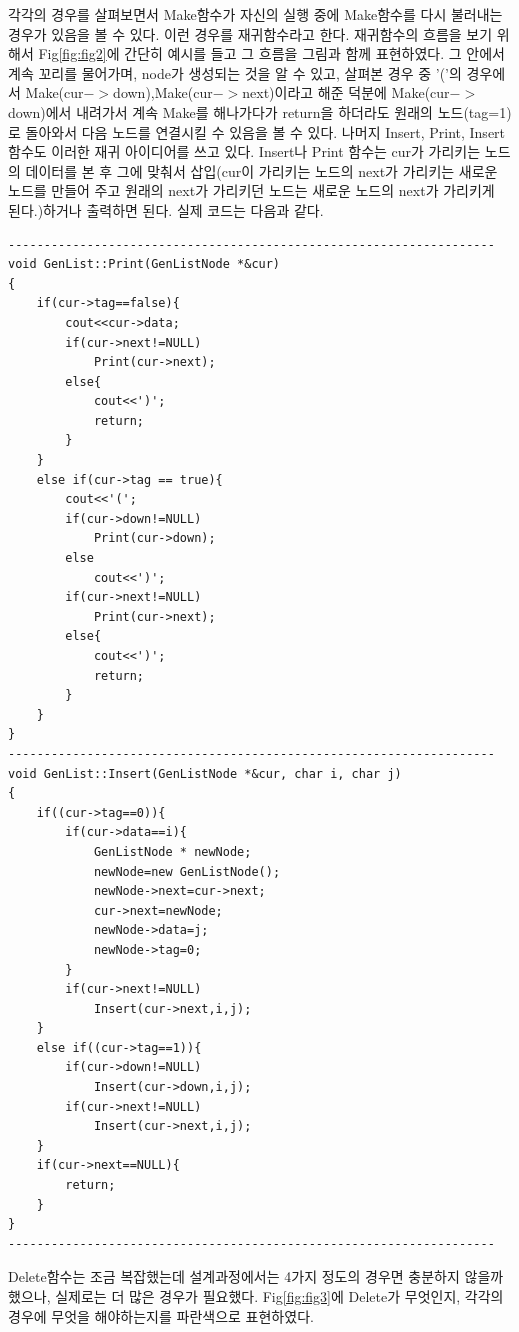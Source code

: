 \documentclass[a4paper,11pt]{article}
\begin{document}
각각의 경우를 살펴보면서 Make함수가 자신의 실행 중에 Make함수를 다시 불러내는 경우가 있음을 볼 수 있다. 이런 경우를 재귀함수라고 한다.  재귀함수의 흐름을 보기 위해서 Fig\ref{fig:fig2}에 간단히 예시를 들고 그 흐름을 그림과 함께 표현하였다. 그 안에서 계속 꼬리를 물어가며, node가 생성되는 것을 알 수 있고, 살펴본 경우 중 '('의 경우에서 Make(cur$->$down),Make(cur$->$next)이라고 해준 덕분에  Make(cur$->$down)에서 내려가서 계속 Make를 해나가다가 return을 하더라도 원래의 노드(tag=1)로 돌아와서 다음 노드를 연결시킬 수 있음을 볼 수 있다. 나머지 Insert, Print, Insert함수도 이러한 재귀 아이디어를 쓰고 있다. Insert나 Print 함수는 cur가 가리키는 노드의 데이터를 본 후 그에 맞춰서 삽입(cur이 가리키는 노드의 next가 가리키는 새로운 노드를 만들어 주고 원래의 next가 가리키던 노드는 새로운 노드의 next가 가리키게 된다.)하거나 출력하면 된다. 실제 코드는 다음과 같다.
\begin{Verbatim}
--------------------------------------------------------------------
void GenList::Print(GenListNode *&cur)
{
    if(cur->tag==false){
        cout<<cur->data;
        if(cur->next!=NULL)
            Print(cur->next);
        else{
            cout<<')';
            return;
        }
    } 
    else if(cur->tag == true){
        cout<<'(';
        if(cur->down!=NULL)
            Print(cur->down);
        else
            cout<<')';        
        if(cur->next!=NULL)        
            Print(cur->next);
        else{
            cout<<')';
            return;
        }
    }
}
--------------------------------------------------------------------
void GenList::Insert(GenListNode *&cur, char i, char j)
{
    if((cur->tag==0)){
        if(cur->data==i){
            GenListNode * newNode;
            newNode=new GenListNode();
            newNode->next=cur->next;
            cur->next=newNode;
            newNode->data=j;
            newNode->tag=0;
        }
        if(cur->next!=NULL)
            Insert(cur->next,i,j);
    }
    else if((cur->tag==1)){
        if(cur->down!=NULL)
            Insert(cur->down,i,j);
        if(cur->next!=NULL)
            Insert(cur->next,i,j);
    }
    if(cur->next==NULL){
        return;
    }
}
--------------------------------------------------------------------
\end{Verbatim}
\newpage
Delete함수는 조금 복잡했는데 설계과정에서는 4가지 정도의 경우면 충분하지 않을까 했으나, 실제로는 더 많은 경우가 필요했다. Fig\ref{fig:fig3}에 Delete가 무엇인지, 각각의 경우에 무엇을 해야하는지를 파란색으로 표현하였다.
\end{document}
